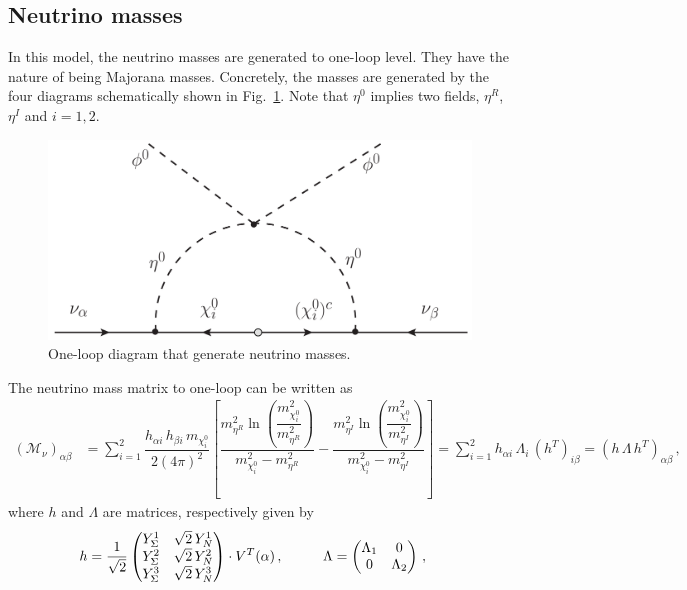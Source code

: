 \documentclass[12pt,letterpaper]{article}
\begin{document}
   

\subsection{Neutrino masses}
\label{sec:neutrino-masses}

In this model, the neutrino masses are generated to one-loop level. They have the nature of being Majorana masses. Concretely, the masses are generated by the four diagrams schematically shown in Fig.~\ref{fig:mass-diagram}. Note that $\eta^0$ implies two fields, $\eta^R$, $\eta^I$ and $i=1,2$.
\begin{figure}
\begin{center}
\includegraphics[scale=0.4]{mass-diagram}
\caption{One-loop diagram that generate neutrino masses. }
\label{fig:mass-diagram}
\end{center}
\end{figure}
The neutrino mass matrix to one-loop can be written as
\begin{align}
\label{eq:Mv-mass-matrix}
(\mathcal{M}_\nu)_{\alpha\beta} &= \sum_{i=1}^2\dfrac{h_{\alpha i}\,h_{\beta i}\,m_{\chi_i^0}}{2(4\pi)^2}
\left[
\dfrac{m_{\eta^R}^2\ln\left(\dfrac{m_{\chi_i^0}^2}{m_{\eta^R}^2}\right)}{m_{\chi_i^0}^2-m_{\eta^R}^2}
-\dfrac{m_{\eta^I}^2\ln\left(\dfrac{m_{\chi_i^0}^2}{m_{\eta^I}^2}\right)}{m_{\chi_i^0}^2-m_{\eta^I}^2}
\right] = \sum_{i=1}^2h_{\alpha i}\,\Lambda_i\,(h^T)_{i\beta}
=(h\,\Lambda\,h^T)_{\alpha\beta}\,,
\end{align}
where $h$ and $\Lambda$ are matrices, respectively given by
\begin{align}
\label{eq:h-Lambda-matrices}
h &= \dfrac{1}{\sqrt{2}}
\begin{pmatrix}
Y_{\Sigma}^1 & \sqrt{2}\,Y_N^1 \\
Y_{\Sigma}^2 & \sqrt{2}\,Y_N^2 \\
Y_{\Sigma}^3 & \sqrt{2}\,Y_N^3
\end{pmatrix}
\cdot V^{T}(\alpha)\,,
\hspace{1 cm}
\Lambda=
\begin{pmatrix}
\Lambda_1 & 0 \\
0 & \Lambda_2
\end{pmatrix}\,,
\end{align}
\end{document}
